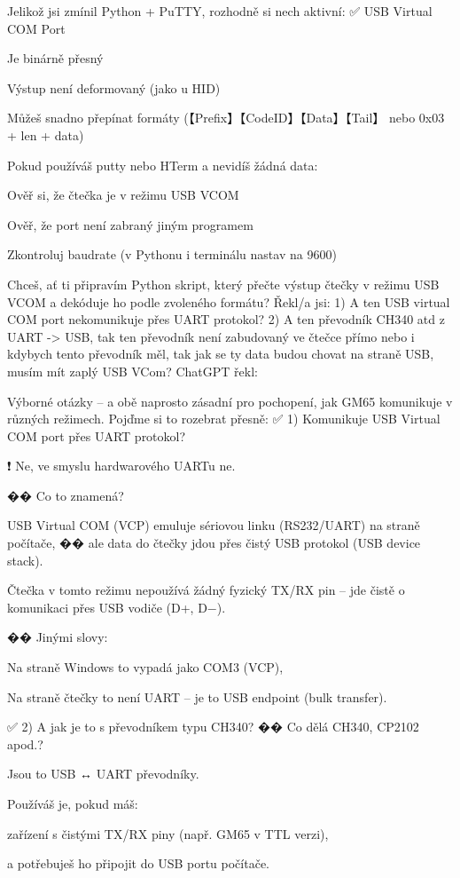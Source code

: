 Jelikož jsi zmínil Python + PuTTY, rozhodně si nech aktivní:
✅ USB Virtual COM Port

    Je binárně přesný

    Výstup není deformovaný (jako u HID)

    Můžeš snadno přepínat formáty (【Prefix】【CodeID】【Data】【Tail】 nebo 0x03 + len + data)

Pokud používáš putty nebo HTerm a nevidíš žádná data:

    Ověř si, že čtečka je v režimu USB VCOM

    Ověř, že port není zabraný jiným programem

    Zkontroluj baudrate (v Pythonu i terminálu nastav na 9600)

Chceš, ať ti připravím Python skript, který přečte výstup čtečky v režimu USB VCOM a dekóduje ho podle zvoleného formátu?
Řekl/a jsi:
1) A ten USB virtual COM port nekomunikuje přes UART protokol? 
2) A ten převodník CH340 atd z UART -> USB, tak ten převodník není zabudovaný ve čtečce přímo nebo i kdybych tento převodník měl, tak jak se ty data budou chovat na straně USB, musím mít zaplý USB VCom? 
ChatGPT řekl:

Výborné otázky – a obě naprosto zásadní pro pochopení, jak GM65 komunikuje v různých režimech. Pojďme si to rozebrat přesně:
✅ 1) Komunikuje USB Virtual COM port přes UART protokol?

    ❗ Ne, ve smyslu hardwarového UARTu ne.

�� Co to znamená?

    USB Virtual COM (VCP) emuluje sériovou linku (RS232/UART) na straně počítače,
    �� ale data do čtečky jdou přes čistý USB protokol (USB device stack).

    Čtečka v tomto režimu nepoužívá žádný fyzický TX/RX pin – jde čistě o komunikaci přes USB vodiče (D+, D−).

�� Jinými slovy:

    Na straně Windows to vypadá jako COM3 (VCP),

    Na straně čtečky to není UART – je to USB endpoint (bulk transfer).

✅ 2) A jak je to s převodníkem typu CH340?
�� Co dělá CH340, CP2102 apod.?

    Jsou to USB ↔ UART převodníky.

Používáš je, pokud máš:

    zařízení s čistými TX/RX piny (např. GM65 v TTL verzi),

    a potřebuješ ho připojit do USB portu počítače.

